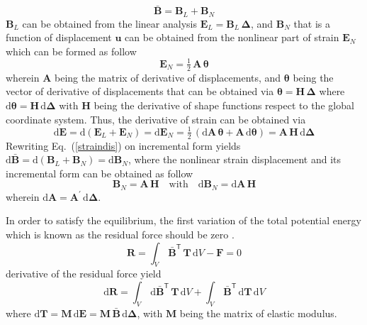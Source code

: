 \begin{equation}
\bar{\mathbf{B}} = \mathbf{B}_L + \mathbf{B}_N
\label{straindis}
\end{equation} 
$\mathbf{B}_L$ can be obtained from the linear analysis $\mathbf{E}_L = \mathbf{B}_L \, \boldsymbol{\Delta}$, and $\mathbf{B}_N$ that is a function of displacement $ \mathbf{u}$ can be obtained from the nonlinear part of strain $\mathbf{E}_N$ which can be formed as follow 
\begin{equation}
\mathbf{E}_N = \tfrac{1}{2} \, {\mathbf{A}} \,  \boldsymbol{\theta}
\end{equation}
wherein ${\mathbf{A}}$ being the matrix of  derivative of displacements, and $\boldsymbol{\theta}$ being the vector of derivative of displacements that can be obtained via $\boldsymbol{\theta} = \mathbf{H} \, \boldsymbol{\Delta} $ where $\mathrm{d} \boldsymbol{\theta} = \mathbf{H} \, \mathrm{d} \boldsymbol{\Delta}$ with $\mathbf{H}$ being the derivative of shape functions respect to the global coordinate system. Thus, the derivative of strain can be obtained via
\begin{equation}
\mathrm{d} \mathbf{E} = \mathrm{d} (\mathbf{E}_L + \mathbf{E}_N) = \mathrm{d} \mathbf{E}_N = \tfrac{1}{2} \, (\mathrm{d} \mathbf{A} \, \boldsymbol{\theta} + \mathbf{A} \, \mathrm{d} \boldsymbol{\theta}) = \mathbf{A} \, \mathbf{H} \, \mathrm{d} \boldsymbol{\Delta}
\label{dstrain1}
\end{equation} 
Rewriting Eq.~(\ref{straindis}) on incremental form yields $\mathrm{d} \bar{\mathbf{B}} = \mathrm{d} (\mathbf{B}_L + \mathbf{B}_N) = \mathrm{d} \mathbf{B}_N$, where the nonlinear strain displacement and its incremental form can be obtained as follow
\begin{equation}
\mathbf{B}_N = \mathbf{A} \, \mathbf{H} \quad \text{with} \quad \mathrm{d} \mathbf{B}_N = \mathrm{d} \mathbf{A} \, \mathbf{H}
\end{equation} 
 wherein $\mathrm{d} \mathbf{A} = \mathbf{A}^{'} \, \mathrm{d} \boldsymbol{\Delta} $.

In order to satisfy the equilibrium, the first variation of the total potential energy which is known as the residual force should be zero \cite{Elseifi98}. 
\begin{equation}
\mathbf{R} = \int_{V} \, \bar{\mathbf{B}}^{\mathsf{T}} \, \mathbf{T} \, \mathrm{d} V - \mathbf{F} = 0
\label{residual}
\end{equation}
derivative of the residual force yield 
\begin{equation}
\mathrm{d} \mathbf{R} = \int_{V} \, \mathrm{d} \bar{\mathbf{B}}^{\mathsf{T}} \, \mathbf{T} \, \mathrm{d} V + \int_{V} \, \bar{\mathbf{B}}^{\mathsf{T}} \, \mathrm{d} \mathbf{T} \, \mathrm{d} V 
\label{diffresidual}
\end{equation}
where $\mathrm{d} \mathbf{T} = \mathbf{M} \, \mathrm{d} \mathbf{E} = \mathbf{M} \,  \bar{\mathbf{B}} \, \mathrm{d} \boldsymbol{\Delta}$, with $\mathbf{M}$ being the matrix of elastic modulus. 

